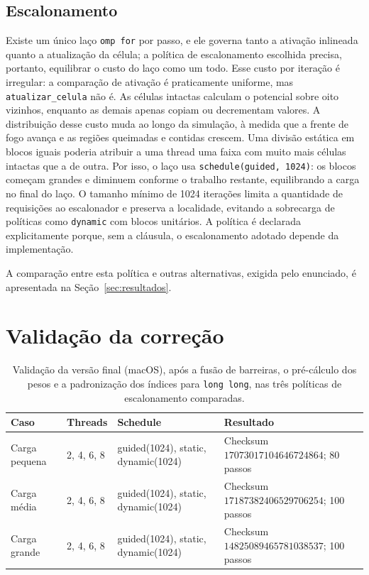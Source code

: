\documentclass[12pt,a4paper]{article}
\begin{document}
\subsection{Escalonamento}\label{sec:escalonamento}

Existe um único laço \texttt{omp for} por
passo, e ele governa tanto a ativação inlineada quanto a atualização da
célula; a política de escalonamento escolhida precisa, portanto,
equilibrar o custo do laço como um todo. Esse custo por iteração é
irregular: a comparação de ativação é praticamente uniforme, mas
\texttt{atualizar\_celula} não é. As células intactas calculam o
potencial sobre oito vizinhos, enquanto as demais apenas copiam ou
decrementam valores. A distribuição desse custo muda ao longo da
simulação, à medida que a frente de fogo avança e as regiões queimadas e
contidas crescem. Uma divisão estática em blocos iguais poderia atribuir
a uma thread uma faixa com muito mais células intactas que a de outra.
Por isso, o laço usa \texttt{schedule(guided, 1024)}: os blocos começam
grandes e diminuem conforme o trabalho restante, equilibrando a carga no
final do laço. O tamanho mínimo de 1024 iterações limita a quantidade de
requisições ao escalonador e preserva a localidade, evitando a
sobrecarga de políticas como \texttt{dynamic} com blocos unitários. A
política é declarada explicitamente porque, sem a cláusula, o
escalonamento adotado depende da implementação.

A comparação entre esta política e outras alternativas, exigida pelo
enunciado, é apresentada na Seção~\ref{sec:resultados}.

\section{Validação da correção}\label{sec:validacao}


\begin{table}[H]
\centering
\caption{Validação da versão final (macOS), após a fusão de barreiras, o
pré-cálculo dos pesos e a padronização dos índices para \texttt{long long},
nas três políticas de escalonamento comparadas.}
\begin{tabularx}{\linewidth}{@{}p{2.6cm}p{1.4cm}p{2.7cm}X@{}}
\toprule
\textbf{Caso} & \textbf{Threads} & \textbf{Schedule} & \textbf{Resultado} \\
\midrule
Carga pequena & 2, 4, 6, 8 & guided(1024), static, dynamic(1024) & Checksum $17073017104646724864$; 80 passos \\
Carga média & 2, 4, 6, 8 & guided(1024), static, dynamic(1024) & Checksum $17187382406529706254$; 100 passos \\
Carga grande & 2, 4, 6, 8 & guided(1024), static, dynamic(1024) & Checksum $14825089465781038537$; 100 passos \\
\bottomrule
\end{tabularx}
\end{table}
\end{document}
